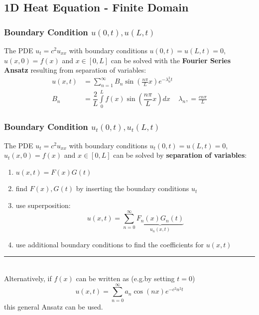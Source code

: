 \subsection{1D Heat Equation - Finite Domain}\label{ssec:1d_heat_fin}
\subsubsection{Boundary Condition \texorpdfstring{$u(0,t), u(L,t)$}{u (0,t), u (L,t)}}
The PDE $u_t=c^2u_{xx}$ with boundary conditions $u(0,t)=u(L,t)=0$, $u(x,0)=f(x)$
and $x\in[0,L]$ can be solved with the \textbf{Fourier Series Ansatz} resulting
from separation of variables:
\begin{align*}
    u(x,t) & =\sum_{n=1}^\infty B_n\sin(\frac{n\pi}Lx)e^{-\lambda_n^2t}                                \\
    B_n    & =\dfrac{2}{L}\int\limits_0^{L}f(x)\sin(\dfrac{n\pi}{L}x)dx & \lambda_n, = \frac{cn\pi}{L}
\end{align*}

\subsubsection{Boundary Condition \texorpdfstring{$u_{t}(0,t),u_{t}(L,t)$}{ut (0,t), ut (L,t)}}
The PDE $u_{t}=c^2u_{xx}$ with boundary conditions $u_t(0,t)=u(L,t)=0$, $u_t(x,0)=f(x)$
and $x\in[0,L]$ can be solved by \textbf{separation of variables}:
\begin{enumerate}
    \item $u(x,t)=F(x)G(t)$
    \item find $F(x),G(t)$ by inserting the boundary conditions $u_t$
    \item use superposition:
          \begin{equation*}
              u(x,t)=\sum_{n=0}^{\infty} \underbrace{F_n(x)G_n(t)}_{u_n(x,t)}
          \end{equation*}
    \item use additional boundary conditions to find the coefficients for $u(x,t)$
\end{enumerate}
{\color{gray}\hrule}\, \\
Alternatively, if $f(x)$ can be written as (e.g.\@ by setting $t = 0$)
\begin{equation*}
    u(x,t)=\sum_{n=0}^{\infty}a_n\cos(nx)e^{-c^2n^2t}
\end{equation*}
this general Ansatz can be used.
